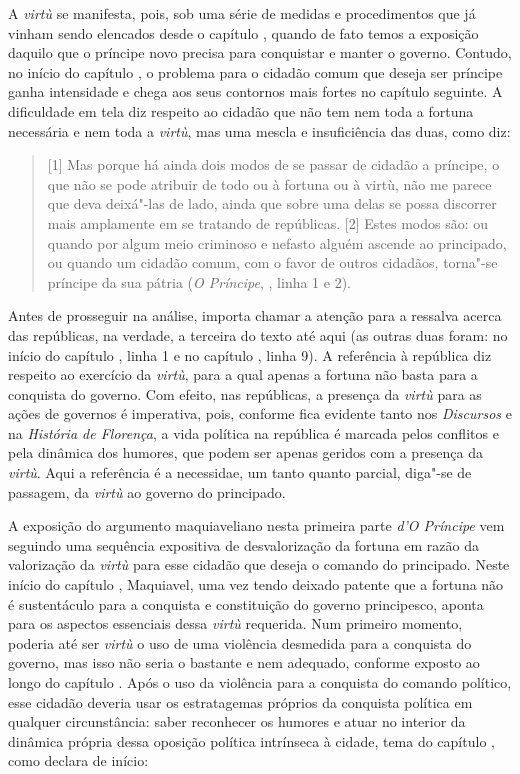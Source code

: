 A \emph{virtù} se manifesta, pois, sob uma série de medidas e
procedimentos que já vinham sendo elencados desde o capítulo , quando
de fato temos a exposição daquilo que o príncipe novo precisa para
conquistar e manter o governo. Contudo, no início do capítulo , o
problema para o cidadão comum que deseja ser príncipe ganha intensidade
e chega aos seus contornos mais fortes no capítulo seguinte. A
dificuldade em tela diz respeito ao cidadão que não tem nem toda a
fortuna necessária e nem toda a \emph{virtù}, mas uma mescla e
insuficiência das duas, como diz:

\begin{quote}
{[}1{]} Mas porque há ainda dois modos de se passar de cidadão a
príncipe, o que não se pode atribuir de todo ou à fortuna ou à virtù,
não me parece que deva deixá"-las de lado, ainda que sobre uma delas se
possa discorrer mais amplamente em se tratando de repúblicas. {[}2{]}
Estes modos são: ou quando por algum meio criminoso e nefasto alguém
ascende ao principado, ou quando um cidadão comum, com o favor de outros
cidadãos, torna"-se príncipe da sua pátria (\emph{O Príncipe}, , linha 1 e
2).
\end{quote}

Antes de prosseguir na análise, importa chamar a atenção para a ressalva
acerca das repúblicas, na verdade, a terceira do texto até aqui (as
outras duas foram: no início do capítulo , linha 1 e no capítulo ,
linha 9). A referência à república diz respeito ao exercício da
\emph{virtù}, para a qual apenas a fortuna não basta para a conquista do
governo. Com efeito, nas repúblicas, a presença da \emph{virtù} para as
ações de governos é imperativa, pois, conforme fica evidente tanto nos
\emph{Discursos} e na \emph{História de Florença}, a vida política na
república é marcada pelos conflitos e pela dinâmica dos humores, que
podem ser apenas geridos com a presença da \emph{virtù}. Aqui a
referência é a necessidae, um tanto quanto parcial, diga"-se de passagem,
da \emph{virtù} ao governo do principado.

A exposição do argumento maquiaveliano nesta primeira parte \emph{d'O
Príncipe} vem seguindo uma sequência expositiva de desvalorização da
fortuna em razão da valorização da \emph{virtù} para esse cidadão que
deseja o comando do principado. Neste início do capítulo ,
Maquiavel, uma vez tendo deixado patente que a fortuna não é
sustentáculo para a conquista e constituição do governo principesco,
aponta para os aspectos essenciais dessa \emph{virtù} requerida. Num
primeiro momento, poderia até ser \emph{virtù} o uso de uma violência
desmedida para a conquista do governo, mas isso não seria o bastante e
nem adequado, conforme exposto ao longo do capítulo . Após o uso da
violência para a conquista do comando político, esse cidadão deveria
usar os estratagemas próprios da conquista política em qualquer
circunstância: saber reconhecer os humores e atuar no interior da
dinâmica própria dessa oposição política intrínseca à cidade, tema do
capítulo , como declara de início:

